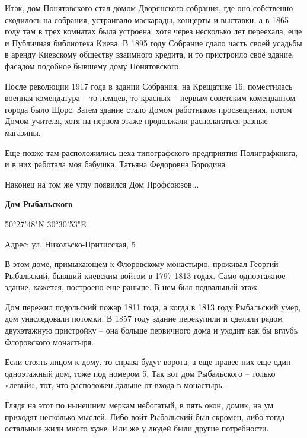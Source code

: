 Итак, дом Понятовского стал домом Дворянского собрания, где оно собственно сходилось на собрания, устраивало маскарады, концерты и выставки, а в 1865 году там в трех комнатах была устроена, хотя через несколько лет переехала, еще и Публичная библиотека Киева. В 1895 году Собрание сдало часть своей усадьбы в аренду Киевскому обществу взаимного кредита, и то пристроило своё здание, фасадом подобное бывшему дому Понятовского. 

После революции 1917 года в здании Собрания, на Крещатике 16, поместилась военная комендатура – то немцев, то красных – первым советским комендантом города было Щорс. Затем здание стало Домом работников просвещения, потом Домом учителя, хотя на первом этаже продолжали располагаться разные магазины.

Еще позже там расположились цеха типографского предприятия Полиграфкнига, и в них работала моя бабушка, Татьяна Федоровна Бородина.

Наконец на том же углу появился Дом Профсоюзов...\\

\medskip


\textbf{Дом Рыбальского}

50°27'48"N  30°30'53"E

Адрес: ул. Никольско-Притисская, 5

В этом доме, примыкающем к Флоровскому монастырю, проживал Георгий Рыбальский, бывший киевским войтом в 1797-1813 годах. Само одноэтажное здание, кажется, построено еще раньше. В нем был подвальный этаж.

Дом пережил подольский пожар 1811 года, а когда в 1813 году Рыбальский умер, дом унаследовали потомки. В 1857 году здание перекупили и сделали рядом двухэтажную пристройку – она больше первичного дома и уходит как бы вглубь Флоровского монастыря.

Если стоять лицом к дому, то справа будут ворота, а еще правее них еще один одноэтажный дом, тоже под номером 5. Так вот дом Рыбальского – только «левый», тот, что расположен дальше от входа в монастырь.

Глядя на этот по нынешним меркам небогатый, в пять окон, домик, на ум приходят несколько мыслей. Либо войт Рыбальский был скромен, либо тогда остальные жили много хуже. Или же у людей были другие потребности.\\

